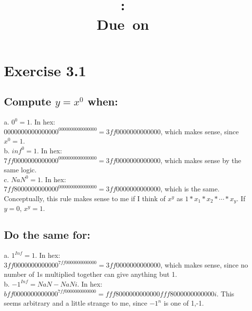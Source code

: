 \documentclass[11pt]{modart}
\title{\large{\hmwkAuthorName}\vspace{0.1in}\\\textmd{\textbf{\hmwkClass:\ \hmwkTitle}}\\\normalsize\vspace{0.1in}\small{Due\ on\ \hmwkDueDate}\\\vspace{0.1in}\large{\textit{\hmwkClassInstructor}}\vspace{0.5in}}
\author{}
\date{}
\begin{document}
\maketitle

\section{Exercise 3.1}
\subsection{Compute $y= x^0$ when:}
a. $0^0=1$.  In hex:\\
$0000000000000000^{0000000000000000} = 3ff0000000000000$, which makes sense, since $x^0 = 1$.\\
b. $inf^0 = 1$. In hex:\\
$7ff0000000000000^{0000000000000000} = 3ff0000000000000$, which makes sense by the same logic.\\
c. $NaN^0 = 1$. In hex:\\
$7ff8000000000000^{0000000000000000} = 3ff0000000000000$, which is the same.\\
Conceptually, this rule makes sense to me if I think of $x^y$ as $1*x_1*x_2*\cdots*x_{y}$.  If $y=0$, $x^y=1$.
\subsection{Do the same for:}
a. $1^{Inf}=1$.  In hex:\\
$3ff0000000000000^{7ff0000000000000} = 3ff0000000000000$, which makes sense, since no number of 1s multiplied together can give anything but 1.\\

b. $-1^{Inf}=NaN - NaNi$.  In hex:\\
$bff0000000000000^{7ff0000000000000} = fff8000000000000  fff8000000000000i$.  This seems arbitrary and a little strange to me, since $-1^n$ is one of {1,-1}.
\end{document}
